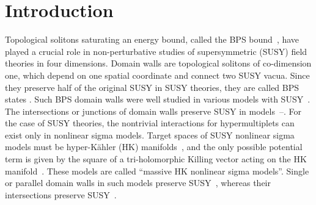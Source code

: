 \documentclass[a4paper,12pt]{article}
\providecommand{\kahler}{K\"{a}hler }
\begin{document}
\section{Introduction}\label{INTRO}

Topological solitons saturating an energy bound, 
called the BPS bound~\cite{BPS,WittenOlive}, 
have played a crucial role in 
non-perturbative studies of supersymmetric 
(SUSY) field theories in four dimensions.  
Domain walls are topological solitons of co-dimension one, 
which depend on one spatial coordinate and connect two SUSY vacua.
Since they preserve half of the original SUSY in 
\coordHE{} SUSY theories, 
they are called \coordHE{} BPS states \cite{Gauntlett}.  
Such BPS domain walls were well studied 
in various models with 
\coordHE{} SUSY~\cite{CGR,DvaliShifman}.  
The intersections or junctions of domain walls 
preserve \coordHE{} SUSY in \coordHE{} 
models~\cite{AbrahamTownsend}--\cite{NNS}. 
For the case of \coordHE{} SUSY theories, 
the nontrivial interactions for hypermultiplets can exist only 
in nonlinear sigma models. 
Target spaces of \coordHE{} SUSY nonlinear sigma models 
must be hyper-\kahler (HK) manifolds~\cite{AF1}, 
and the only possible potential term is given by  
the square of a tri-holomorphic 
Killing vector acting on the HK manifold~\cite{AF2,Sierra}. 
These models are called ``massive HK nonlinear sigma models''.  
Single or parallel domain walls in such models 
preserve \coordHE{} SUSY~\cite{AT,Townsend3}, 
whereas their intersections preserve \coordHE{} SUSY~\cite{Townsend1}. 
\end{document}
